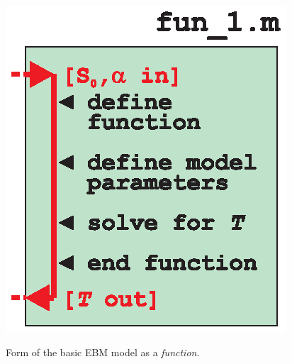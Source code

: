 \documentclass{tufte-book} %
\begin{document}
\begin{marginfigure}[0.125in]
\includegraphics[width=\linewidth]{ch8-schematic-fun1.eps}
\caption{Form of the basic EBM model as a \textit{function}.}
\label{fig:ch8-schematic-fun1}
\end{marginfigure}
\end{document}
